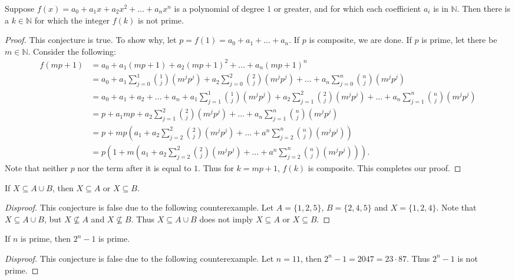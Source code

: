 \documentclass{exam}
\begin{document}
\begin{conjecture}{9.33}
    Suppose $f(x)=a_0+a_1x+a_2x^2+\dots+a_nx^n$ is a polynomial of degree $1$ or greater, and for which each coefficient $a_i$ is in $\mathbb N$. Then there is a $k\in\mathbb N$ for which the integer $f(k)$ is not prime.
\end{conjecture}

\begin{proof}
    This conjecture is true. To show why, let $p = f(1) = a_0 + a_1 + \dots + a_n$. If $p$ is composite, we are done. If $p$ is prime, let there be $m\in\mathbb N$. Consider the following:
    \begin{align*}
        f(mp + 1) &= a_0 + a_1(mp+1) + a_2(mp+1)^2+\dots+a_n(mp+1)^n\\
        &=a_0 + a_1\sum_{j=0}^1\binom 1 j(m^jp^j) + a_2\sum_{j=0}^2\binom 2 j(m^jp^j) +\dots+a_n\sum_{j=0}^n\binom n j(m^jp^j)\\
        &=a_0 + a_1 + a_2 +\dots+a_n + a_1\sum_{j=1}^1\binom 1 j(m^jp^j)+a_2\sum_{j=1}^2\binom 2 j(m^jp^j)+\dots+a_n\sum_{j=1}^n\binom n j(m^jp^j)\\
        &=p + a_1mp + a_2\sum_{j=1}^2\binom 2 j(m^jp^j)+\dots+a_n\sum_{j=1}^n\binom n j(m^jp^j)\\
        &=p + mp(a_1 + a_2\sum_{j=2}^2\binom 2 j(m^jp^j)+\dots+a^n\sum_{j=2}^n\binom n j(m^jp^j))\\
        &=p(1 + m(a_1 + a_2\sum_{j=2}^2\binom 2 j(m^jp^j)+\dots+a^n\sum_{j=2}^n\binom n j(m^jp^j))).
    \end{align*}
    Note that neither $p$ nor the term after it is equal to $1$. Thus for $k = mp + 1$, $f(k)$ is composite. This completes our proof.
\end{proof}

\begin{conjecture}{9.34}
    If $X\subseteq A\cup B$, then $X\subseteq A$ or $X\subseteq B$.
\end{conjecture}

\begin{proof}[Disproof]
    This conjecture is false due to the following counterexample. Let $A = \{1, 2, 5\}$, $B = \{2, 4, 5\}$ and $X=\{1, 2, 4\}$. Note that $X\subseteq A\cup B$, but $X\nsubseteq A$ and $X\nsubseteq B$. Thus $X\subseteq A\cup B$ does not imply $X\subseteq A$ or $X\subseteq B$.
\end{proof}

\begin{conjecture}{9.35}
    If $n$ is prime, then $2^n-1$ is prime.
\end{conjecture}

\begin{proof}[Disproof]
    This conjecture is false due to the following counterexample. Let $n = 11$, then $2^n-1 = 2047 = 23\cdot 87$. Thus $2^n-1$ is not prime.
\end{proof}
\end{document}
